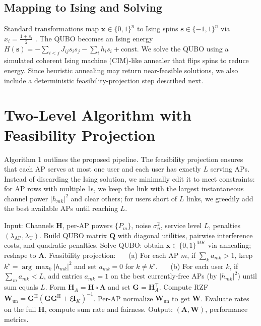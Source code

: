 {\subsection{Mapping to Ising and Solving}
Standard transformations map $\mathbf{x}\in\{0,1\}^n$ to Ising spins $\mathbf{s}\in\{-1,1\}^n$ via $x_i=\frac{1+s_i}{2}$ \cite{lucas2014ising,glover2018tutorial}. The QUBO becomes an Ising energy $H(\mathbf{s})=-\sum_{i<j}J_{ij}s_is_j-\sum_i h_i s_i+\text{const}$. We solve the QUBO using a simulated coherent Ising machine (CIM)-like annealer that flips spins to reduce energy. Since heuristic annealing may return near-feasible solutions, we also include a deterministic feasibility-projection step described next.

\section{Two-Level Algorithm with Feasibility Projection}
Algorithm 1 outlines the proposed pipeline. The feasibility projection ensures that each AP serves at most one user and each user has exactly $L$ serving APs. Instead of discarding the Ising solution, we minimally edit it to meet constraints: for AP rows with multiple 1s, we keep the link with the largest instantaneous channel power $|h_{mk}|^2$ and clear others; for users short of $L$ links, we greedily add the best available APs until reaching $L$.

\begin{algorithm}[htbp]
\caption{Two-Level QUBO-RZF with Feasibility Projection}
\begin{algorithmic}[1]
\State Input: Channels $\mathbf{H}$, per-AP powers $\{P_m\}$, noise $\sigma_n^2$, service level $L$, penalties $(\lambda_{\text{AP}},\lambda_{\text{U}})$.
\State Build QUBO matrix $\mathbf{Q}$ with diagonal utilities, pairwise interference costs, and quadratic penalties.
\State Solve QUBO: obtain $\mathbf{x}\in\{0,1\}^{MK}$ via annealing; reshape to $\mathbf{A}$.
\State Feasibility projection:
\State ~~~(a) For each AP $m$, if $\sum_k a_{mk}>1$, keep $k^\star=\arg\max_k |h_{mk}|^2$ and set $a_{mk}=0$ for $k\neq k^\star$.
\State ~~~(b) For each user $k$, if $\sum_m a_{mk}<L$, add entries $a_{mk}=1$ on the best currently-free APs (by $|h_{mk}|^2$) until sum equals $L$.
\State Form $\mathbf{H}_A=\mathbf{H}\circ \mathbf{A}$ and set $\mathbf{G}=\mathbf{H}_A^\top$.
\State Compute RZF $\mathbf{W}_{\mathrm{un}}=\mathbf{G}^\mathrm{H}(\mathbf{G}\mathbf{G}^\mathrm{H}+\xi \mathbf{I}_K)^{-1}$.
\State Per-AP normalize $\mathbf{W}_{\mathrm{un}}$ to get $\mathbf{W}$.
\State Evaluate rates on the full $\mathbf{H}$, compute sum rate and fairness.
\State Output: $(\mathbf{A},\mathbf{W})$, performance metrics.
\end{algorithmic}
\end{algorithm}

}
